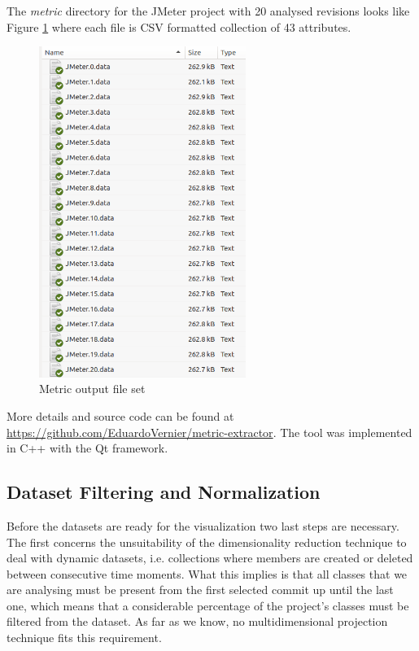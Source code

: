 The \textit{metric} directory for the JMeter project with 20 analysed revisions looks like Figure \ref{fig:jmeter_folder} where each file is CSV formatted collection of 43 attributes.

\begin{figure}[H]
  \centering
  \includegraphics[width=0.6\textwidth]{figures/metric_dir.png}
  \caption{Metric output file set}
  \label{fig:jmeter_folder}
\end{figure}

More details and source code can be found at \url{https://github.com/EduardoVernier/metric-extractor}. The tool was implemented in C++ with the Qt framework.

\subsection{Dataset Filtering and Normalization} \label{sec:filtering}
Before the datasets are ready for the visualization two last steps are necessary. The first concerns the unsuitability of the dimensionality reduction technique to deal with dynamic datasets, i.e. collections where members are created or deleted between consecutive time moments. What this implies is that all classes that we are analysing must be present from the first selected commit up until the last one, which means that a considerable percentage of the project's classes must be filtered from the dataset. As far as we know, no multidimensional projection technique fits this requirement.

